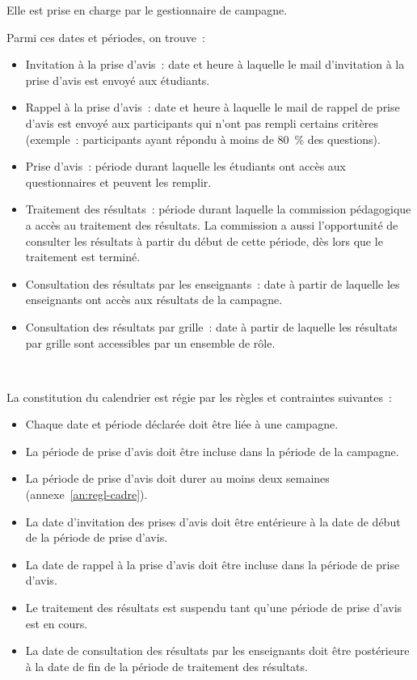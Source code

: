 \documentclass[a4paper,11pt]{report}
\begin{document}
\noindent Elle est prise en charge par le gestionnaire de campagne.

\noindent Parmi ces dates et périodes, on trouve~:
\begin{itemize}
	\item Invitation à la prise d'avis~: date et heure à laquelle le mail d'invitation à la prise d'avis est envoyé aux étudiants.
	\item Rappel à la prise d'avis~: date et heure à laquelle le mail de rappel de prise d'avis est envoyé aux participants qui n'ont pas rempli certains critères (exemple~: participants ayant répondu à moins de 80~\% des questions).
	\item Prise d'avis~: période durant laquelle les étudiants ont accès aux questionnaires et peuvent les remplir.
	\item Traitement des résultats~: période durant laquelle la commission pédagogique a accès au traitement des résultats. La commission a aussi l'opportunité de consulter les résultats à partir du début de cette période, dès lors que le traitement est terminé.
	\item Consultation des résultats par les enseignants~: date à partir de laquelle les enseignants ont accès aux résultats de la campagne.
	\item Consultation des résultats par grille~: date à partir de laquelle les résultats par grille sont accessibles par un ensemble de rôle.
\end{itemize}
~\newline{}

La constitution du calendrier est régie par les règles et contraintes suivantes~:
\begin{itemize}
	\item Chaque date et période déclarée doit être liée à une campagne.
	\item La période de prise d'avis doit être incluse dans la période de la campagne.
	\item La période de prise d'avis doit durer au moins deux semaines (annexe~\ref{an:regl-cadre}).
	\item La date d'invitation des prises d'avis doit être entérieure à la date de début de la période de prise d'avis.
	\item La date de rappel à la prise d'avis doit être incluse dans la période de prise d'avis.
	\item Le traitement des résultats est suspendu tant qu'une période de prise d'avis est en cours.
	\item La date de consultation des résultats par les enseignants doit être postérieure à la date de fin de la période de traitement des résultats.
\end{itemize}
\end{document}
